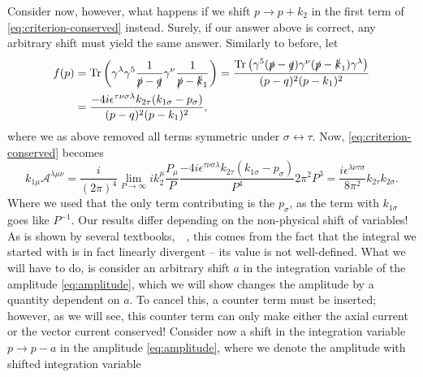 Consider now, however, what happens if we shift $p\to p+k_2$ in the first term of \cref{eq:criterion-conserved} instead.
Surely, if our answer above is correct, any arbitrary shift must yield the same answer.
Similarly to before, let
\begin{equation}
  \begin{split}
    f(p) &= \operatorname{Tr}\left(\gamma^{\lambda }\gamma^5 \frac{1}{\slashed{p} - \slashed{q}} \gamma^{\nu } \frac{1}{\slashed{p} - \slashed{k}_{1}} \right)
         = \frac{\operatorname{Tr} \left( \gamma ^5 (\slashed{p}-\slashed{q}) \gamma ^{\nu } (\slashed{p}-\slashed{k}_1)\gamma ^{\lambda } \right)}{
           (p-q)^2(p-k_1)^2
           }\\
         &=
           \frac{-4i\epsilon ^{\tau \nu \sigma \lambda } k_{2\tau } (k_{1\sigma } - p_{\sigma })}{
           (p-q)^2(p-k_1)^2
           },
  \end{split}
\end{equation}
where we as above removed all terms symmetric under $\sigma \leftrightarrow \tau$.
Now, \cref{eq:criterion-conserved} becomes
\begin{equation}
  k_{1\mu } \mathcal{A}^{\lambda \mu \nu } =
  \frac{i}{(2\pi)^4} \lim_{P \to \infty } ik_2^{\mu } \frac{P_{\mu }}{P}
  \frac{{-4i\epsilon ^{\tau \nu \sigma \lambda } k_{2\tau } (k_{1\sigma }-p_{\sigma })}}{P^{4}}
  2\pi^2P^3
  = \frac{ i \epsilon ^{\lambda \nu \tau \sigma } }{8\pi^2}  k_{2\tau }k_{2\sigma }.
\end{equation}
Where we used that the only term contributing is the $p_{\sigma }$, as the term with $k_{1\sigma }$ goes like $P^{-1}$.
Our results differ depending on the non-physical shift of variables!
As is shown by several textbooks,~\cite{zeeQuantumFieldTheory2010}~\cite{kachelriessQuantumFieldsHubble2018}, this comes from the fact that the integral we started with is in fact linearly divergent -- its value is not well-defined.
What we will have to do, is consider an arbitrary shift $a$ in the integration variable of the amplitude \cref{eq:amplitude}, which we will show changes the amplitude by a quantity dependent on $a$.
To cancel this, a counter term must be inserted;
however, as we will see, this counter term can only make either the axial current or the vector current conserved!
Consider now a shift in the integration variable $p \to p - a$ in the amplitude \cref{eq:amplitude}, where we denote the amplitude with shifted integration variable
